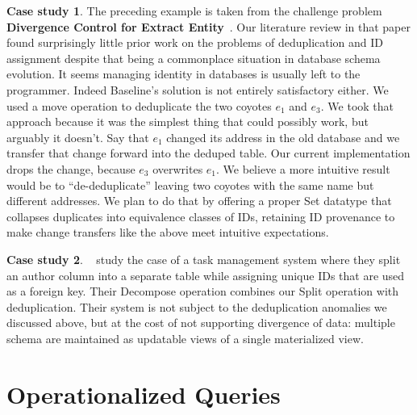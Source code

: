 \documentclass[english,submission]{programming}
\theoremstyle{definition}
\newtheorem{casestudy}{Case study}
\newcommand{\citet}[1]{\citeauthor*{#1}~\cite{#1}}
\newcommand{\mathbox}[1]{\colorbox{black!10}{$#1$\phantom{i\hspace{-3.5pt}}}}
\begin{document}
\begin{casestudy}\label{case-diverge}
The preceding example is taken from the challenge problem \textbf{Divergence Control for Extract Entity}~\cite{challenge-problems}. Our literature review in that paper found surprisingly little prior work on the problems of deduplication and ID assignment despite that being a commonplace situation in database schema evolution.
It seems managing identity in databases is usually left to the programmer.
Indeed Baseline's solution is not entirely satisfactory either.
We used a \textsf{move} operation to deduplicate the two coyotes \mathbox{e_1} and \mathbox{e_3}. We took that approach because it was the simplest thing that could possibly work, but arguably it doesn't. Say that \mathbox{e_1} changed its address in the old database and we transfer that change forward into the deduped table. Our current implementation drops the change, because \mathbox{e_3} overwrites \mathbox{e_1}. We believe a more intuitive result would be to ``de-deduplicate'' leaving two coyotes with the same name but different addresses.
We plan to do that by offering a proper \textsf{Set} datatype that collapses duplicates into equivalence classes of IDs, retaining ID provenance to make change transfers like the above meet intuitive expectations.
\end{casestudy}


\begin{casestudy}
\citet{herrmann17} study the case of a task management system where they split an \textsf{author} column into a separate table while assigning unique IDs that are used as a foreign key. Their \textsf{Decompose} operation combines our \textsf{Split} operation with deduplication.
Their system is not subject to the deduplication anomalies we discussed above, but at the cost of not supporting divergence of data: multiple schema are maintained as updatable views of a single materialized view.
\end{casestudy}


\section{Operationalized Queries}
\end{document}
